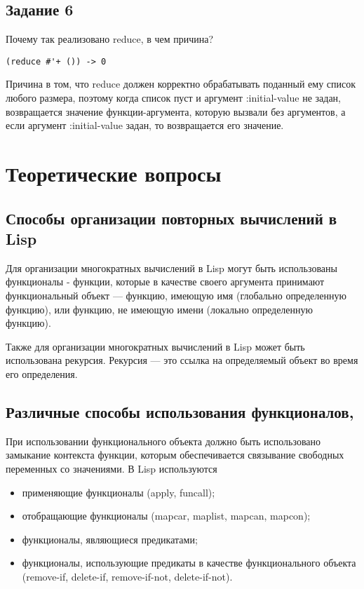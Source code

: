 \documentclass[a4paper,12pt]{article}
\begin{document}
\subsection*{Задание 6}

Почему так реализовано reduce, в чем причина?
\begin{lstlisting}
(reduce #'+ ()) -> 0
\end{lstlisting}

Причина в том, что reduce должен корректно обрабатывать поданный ему список любого размера, поэтому когда список пуст и аргумент :initial-value не задан,  возвращается значение функции-аргумента, которую вызвали без аргументов, а если аргумент :initial-value задан, то возвращается его значение.

\section*{Теоретические вопросы}
\subsection*{Способы организации повторных вычислений в Lisp}

Для организации многократных вычислений в Lisp могут быть использованы функционалы - функции, которые в качестве своего аргумента принимают функциональный объект — функцию, имеющую имя (глобально определенную функцию), или функцию, не имеющую имени (локально определенную функцию).

Также для организации многократных вычислений в Lisp может быть использована рекурсия. Рекурсия — это ссылка на определяемый объект во время его определения. 

\subsection*{Различные способы использования функционалов,}

При использовании функционального объекта должно быть использовано замыкание контекста функции, которым обеспечивается связывание свободных переменных со значениями. В Lisp используются 
\begin{itemize}
	\item применяющие функционалы (apply, funcall);
	\item отобращающие функционалы (mapcar, maplist, mapcan, mapcon);
	\item функционалы, являющиеся предикатами;
	\item функционалы, использующие предикаты в качестве функционального объекта (remove-if, delete-if, remove-if-not, delete-if-not).
\end{itemize} 
\end{document}
